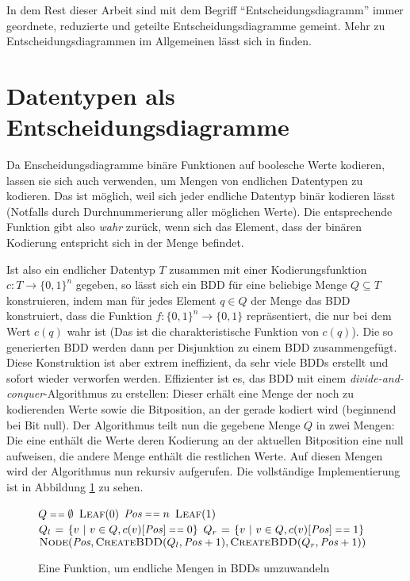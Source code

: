 In dem Rest dieser Arbeit sind mit dem Begriff "`Entscheidungsdiagramm"' immer geordnete, reduzierte und geteilte Entscheidungsdiagramme gemeint.
Mehr zu Entscheidungsdiagrammen im Allgemeinen lässt sich in \cite{knuth2011computer} finden.
\section{Datentypen als Entscheidungsdiagramme}
Da Enscheidungsdiagramme binäre Funktionen auf boolesche Werte kodieren, lassen sie sich auch verwenden, um Mengen von endlichen Datentypen zu kodieren.
Das ist möglich, weil sich jeder endliche Datentyp binär kodieren lässt (Notfalls durch Durchnummerierung aller möglichen Werte).
Die entsprechende Funktion gibt also \emph{wahr} zurück, wenn sich das Element, dass der binären Kodierung entspricht sich in der Menge befindet.

Ist also ein endlicher Datentyp $T$ zusammen mit einer Kodierungsfunktion $c : T\rightarrow \{0,1\}^n$ gegeben, so lässt sich ein BDD für eine beliebige Menge $Q\subseteq T$ konstruieren, indem man für jedes Element $q\in Q$ der Menge das BDD konstruiert, dass die Funktion $f:\{0,1\}^n\rightarrow \{0,1\}$ repräsentiert, die nur bei dem Wert $c(q)$ wahr ist (Das ist die charakteristische Funktion von $c(q)$).
Die so generierten BDD werden dann per Disjunktion zu einem BDD zusammengefügt.
Diese Konstruktion ist aber extrem ineffizient, da sehr viele BDDs erstellt und sofort wieder verworfen werden.
Effizienter ist es, das BDD mit einem \emph{divide-and-conquer}-Algorithmus zu erstellen:
Dieser erhält eine Menge der noch zu kodierenden Werte sowie die Bitposition, an der gerade kodiert wird (beginnend bei Bit null).
Der Algorithmus teilt nun die gegebene Menge $Q$ in zwei Mengen:
Die eine enthält die Werte deren Kodierung an der aktuellen Bitposition eine null aufweisen, die andere Menge enthält die restlichen Werte.
Auf diesen Mengen wird der Algorithmus nun rekursiv aufgerufen.
Die vollständige Implementierung ist in Abbildung \ref{alg:create_bdd} zu sehen.

\begin{figure}[h]
\centering
\begin{codebox}
\li \If $Q\isequal\emptyset$\Then
\li \Return $\textnormal{\scshape Leaf}(0)$
\End
\li \If $\id{Pos}\isequal n$\Then
\li \Return $\textnormal{\scshape Leaf}(1)$
\End
\li $Q_l\gets \{ v\ |\ v\in Q, c(v)[\id{Pos}]\isequal 0 \}$
\li $Q_r\gets \{ v\ |\ v\in Q, c(v)[\id{Pos}]\isequal 1 \}$
\li \Return $\proc{Node}(\id{Pos},\proc{CreateBDD}(Q_l,\id{Pos}+1),\proc{CreateBDD}(Q_r,\id{Pos}+1))$
\end{codebox}
\caption{Eine Funktion, um endliche Mengen in BDDs umzuwandeln}
\label{alg:create_bdd}
\end{figure}

